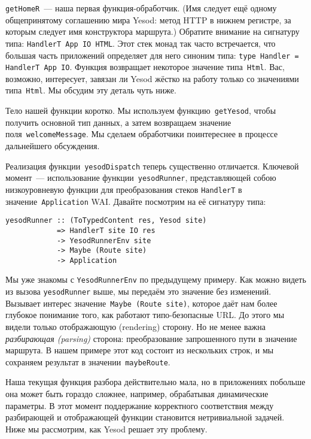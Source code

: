 \lstinline'getHomeR'~--- наша первая функция-обработчик. (Имя следует ещё
одному общепринятому соглашению мира Yesod: метод HTTP в нижнем регистре, за
которым следует имя конструктора маршрута.) Обратите внимание на сигнатуру
типа: \lstinline'HandlerT App IO HTML'. Этот стек монад так часто встречается,
что большая часть приложений определяет для него синоним типа:
\lstinline'type Handler = HandlerT App IO'. Функция возвращает некоторое
значение типа~\lstinline'Html'. Вас, возможно, интересует, завязан ли Yesod
жёстко на работу только со значениями типа~\lstinline'Html'. Мы обсудим эту
деталь чуть ниже.

Тело нашей функции коротко. Мы используем функцию~\lstinline'getYesod', чтобы
получить основной тип данных, а затем возвращаем значение
поля~\lstinline'welcomeMessage'. Мы сделаем обработчики поинтереснее в процессе
дальнейшего обсуждения.

Реализация функции~\lstinline'yesodDispatch' теперь существенно отличается.
Ключевой момент~--- использование функции~\lstinline'yesodRunner',
представляющей собою низкоуровневую функции для преобразования стеков
\lstinline'HandlerT' в значение~\lstinline'Application' WAI. Давайте посмотрим
на её сигнатуру типа:
\begin{lstlisting}
yesodRunner :: (ToTypedContent res, Yesod site)
            => HandlerT site IO res
            -> YesodRunnerEnv site
            -> Maybe (Route site)
            -> Application
\end{lstlisting}

Мы уже знакомы с \lstinline'YesodRunnerEnv' по предыдущему примеру. Как можно
видеть из вызова \lstinline'yesodRunner' выше, мы передаём это значение без
изменений. Вызывает интерес значение~\lstinline'Maybe (Route site)', которое
даёт нам более глубокое понимание того, как работают типо-безопасные URL. До
этого мы видели только отображающую (rendering) сторону. Но не менее важна
\emph{разбирающая (parsing)} сторона: преобразование запрошенного пути в
значение маршрута. В нашем примере этот код состоит из нескольких строк, и
мы сохраняем результат в значении~\lstinline'maybeRoute'.

\begin{remark}
    Наша текущая функция разбора действительно мала, но в приложениях побольше
    она может быть гораздо сложнее, например, обрабатывая динамические
    параметры. В этот момент поддержание корректного соответствия между
    разбирающей и отображающей функции становится нетривиальной задачей. Ниже
    мы рассмотрим, как Yesod решает эту проблему.
\end{remark}

